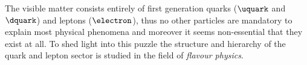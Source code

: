
The visible matter consists entirely of first generation quarks ($\uquark$ and
$\dquark$) and leptons ($\electron$), thus no other particles are mandatory to
explain most physical phenomena and moreover it seems non-essential that they
exist at all. To shed light into this puzzle the structure and hierarchy of the
quark and lepton sector is studied in the field of \emph{flavour physics}.
